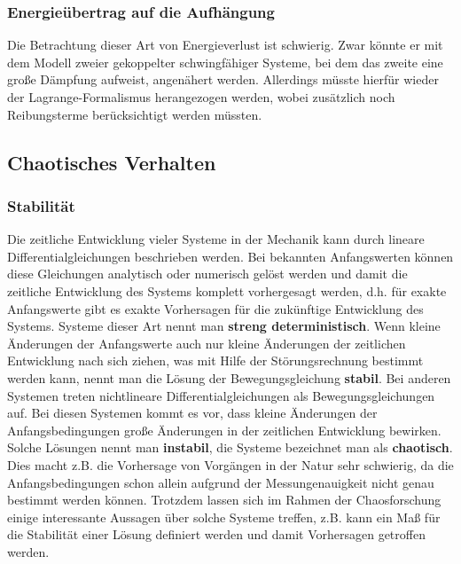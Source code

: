 \subsubsection{Energieübertrag auf die Aufhängung}

Die Betrachtung dieser Art von Energieverlust ist schwierig. Zwar könnte er mit dem Modell zweier gekoppelter schwingfähiger Systeme, bei dem das zweite eine große Dämpfung aufweist, angenähert werden. Allerdings müsste hierfür wieder der Lagrange-Formalismus herangezogen werden, wobei zusätzlich noch Reibungsterme berücksichtigt werden müssten. 

\subsection{Chaotisches Verhalten}
\subsubsection{Stabilität}
Die zeitliche Entwicklung vieler Systeme in der Mechanik kann durch lineare Differentialgleichungen beschrieben werden. Bei bekannten Anfangswerten können diese Gleichungen analytisch oder numerisch gelöst werden und damit die zeitliche Entwicklung des Systems komplett vorhergesagt werden, d.h. für exakte Anfangswerte gibt es exakte Vorhersagen für die zukünftige Entwicklung des Systems. Systeme dieser Art nennt man \textbf{streng deterministisch}. Wenn kleine Änderungen der Anfangswerte auch nur kleine Änderungen der zeitlichen Entwicklung nach sich ziehen, was mit Hilfe der Störungsrechnung bestimmt werden kann, nennt man die Lösung der Bewegungsgleichung \textbf{stabil}.
Bei anderen Systemen treten nichtlineare Differentialgleichungen als Bewegungsgleichungen auf. Bei diesen Systemen kommt es vor, dass kleine Änderungen der Anfangsbedingungen große Änderungen in der zeitlichen Entwicklung bewirken. Solche Lösungen nennt man  \textbf{instabil}, die Systeme bezeichnet man als \textbf{chaotisch}. Dies macht z.B. die Vorhersage von Vorgängen in der Natur sehr schwierig, da die Anfangsbedingungen schon allein aufgrund der Messungenauigkeit nicht genau bestimmt werden können. Trotzdem lassen sich im Rahmen der Chaosforschung einige interessante Aussagen über solche Systeme treffen, z.B. kann ein Maß für die Stabilität einer Lösung definiert werden und damit Vorhersagen getroffen werden.
\\

